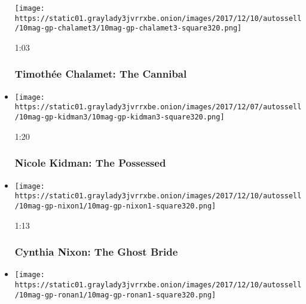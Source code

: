 \begin{itemize}
  \texttt{[image: https://static01.graylady3jvrrxbe.onion/images/2017/12/10/autossell/10mag-gp-chalamet3/10mag-gp-chalamet3-square320.png]}

  1:03

  \hypertarget{timotheux301e-chalamet-the-cannibal}{%
  \subsubsection{Timothée Chalamet: The
  Cannibal}\label{timotheux301e-chalamet-the-cannibal}}
\item
  \href{https://www.nytimes3xbfgragh.onion/video/magazine/100000005588835/nicole-kidman-the-possessed.html?action=click\&module=video-series-bar\&region=header\&pgtype=Article\&playlistId=video/great-performers}{}

  \texttt{[image: https://static01.graylady3jvrrxbe.onion/images/2017/12/07/autossell/10mag-gp-kidman3/10mag-gp-kidman3-square320.png]}

  1:20

  \hypertarget{nicole-kidman-the-possessed}{%
  \subsubsection{Nicole Kidman: The
  Possessed}\label{nicole-kidman-the-possessed}}
\item
  \href{https://www.nytimes3xbfgragh.onion/video/magazine/100000005588895/cynthia-nixon-the-ghost-bride.html?action=click\&module=video-series-bar\&region=header\&pgtype=Article\&playlistId=video/great-performers}{}

  \texttt{[image: https://static01.graylady3jvrrxbe.onion/images/2017/12/10/autossell/10mag-gp-nixon1/10mag-gp-nixon1-square320.png]}

  1:13

  \hypertarget{cynthia-nixon-the-ghost-bride}{%
  \subsubsection{Cynthia Nixon: The Ghost
  Bride}\label{cynthia-nixon-the-ghost-bride}}
\item
  \href{https://www.nytimes3xbfgragh.onion/video/magazine/100000005588911/the-mannequin.html?action=click\&module=video-series-bar\&region=header\&pgtype=Article\&playlistId=video/great-performers}{}

  \texttt{[image: https://static01.graylady3jvrrxbe.onion/images/2017/12/10/autossell/10mag-gp-ronan1/10mag-gp-ronan1-square320.png]}


\end{itemize}
